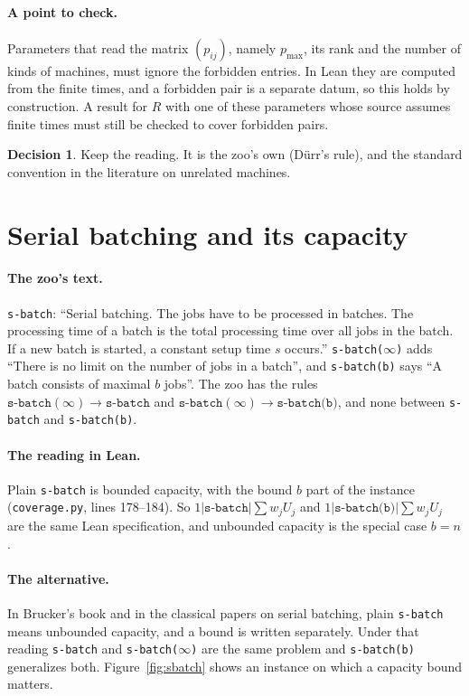 \documentclass[11pt]{article}
\newcommand{\lean}[1]{\texttt{#1}}
\theoremstyle{definition}
\newtheorem{decision}{Decision}
\begin{document}
\paragraph{A point to check.} Parameters that read the matrix $(p_{ij})$, namely
$p_{\max}$, its rank and the number of kinds of machines, must ignore the
forbidden entries. In Lean they are computed from the finite times, and a
forbidden pair is a separate datum, so this holds by construction. A result
for $R$ with one of these parameters whose source assumes finite times must
still be checked to cover forbidden pairs.

\begin{decision}
Keep the reading. It is the zoo's own (Dürr's rule), and the standard
convention in the literature on unrelated machines.
\end{decision}

\section{Serial batching and its capacity}\label{sec:batch}

\paragraph{The zoo's text.} \texttt{s-batch}: ``Serial batching. The jobs have
to be processed in batches. The processing time of a batch is the total
processing time over all jobs in the batch. If a new batch is started, a
constant setup time $s$ occurs.'' \texttt{s-batch($\infty$)} adds ``There is no
limit on the number of jobs in a batch'', and \texttt{s-batch(b)} says ``A
batch consists of maximal $b$ jobs''. The zoo has the rules
$\texttt{s-batch}(\infty)\to\texttt{s-batch}$ and
$\texttt{s-batch}(\infty)\to\texttt{s-batch(b)}$, and none between
\texttt{s-batch} and \texttt{s-batch(b)}.

\paragraph{The reading in Lean.} Plain \texttt{s-batch} is bounded capacity,
with the bound $b$ part of the instance (\lean{coverage.py}, lines 178--184).
So $1|\texttt{s-batch}|\sum w_jU_j$ and $1|\texttt{s-batch(b)}|\sum w_jU_j$ are the
same Lean specification, and unbounded capacity is the special case $b=n$.

\paragraph{The alternative.} In Brucker's book and in the classical papers on
serial batching, plain \texttt{s-batch} means unbounded capacity, and a bound
is written separately. Under that reading \texttt{s-batch} and
\texttt{s-batch($\infty$)} are the same problem and \texttt{s-batch(b)}
generalizes both. Figure~\ref{fig:sbatch} shows an instance on which a
capacity bound matters.
\end{document}
